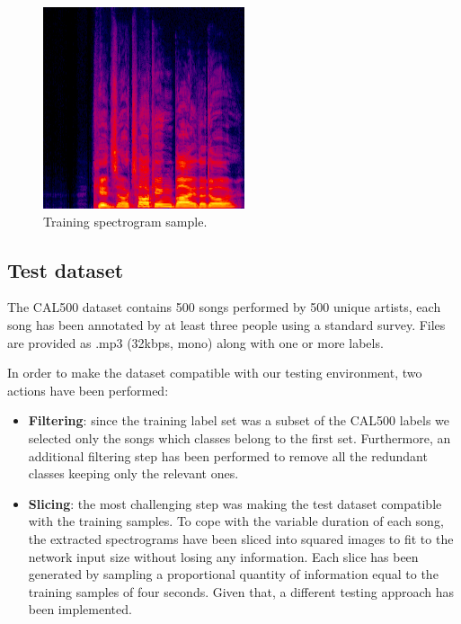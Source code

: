 \documentclass[10pt,twocolumn,letterpaper]{article}
\begin{document}
\begin{figure}[t]
   \begin{center}
   \includegraphics[width=0.8\linewidth]{img/happy_92.png}
   \end{center}
      \caption{Training spectrogram sample.}
   \label{fig:training_sample}
   \end{figure}

\subsection{Test dataset}

The CAL500 dataset contains 500 songs performed by 500 unique artists, each song has been annotated by at least three people using a standard survey. Files are provided as .mp3 (32kbps, mono) along with one or more labels.

In order to make the dataset compatible with our testing environment, two actions have been performed:
\begin{itemize}
\item \textbf{Filtering}: since the training label set was a subset of the CAL500 labels we selected only the songs which classes belong to the first set. Furthermore, an additional filtering step has been performed to remove all the redundant classes keeping only the relevant ones.
\item \textbf{Slicing}: the most challenging step was making the test dataset compatible with the training samples. To cope with the variable duration of each song, the extracted spectrograms have been sliced into squared images to fit to the network input size without losing any information. Each slice has been generated by sampling a proportional quantity of information equal to the training samples of four seconds. Given that, a different testing approach has been implemented.
\end{itemize}
\end{document}
